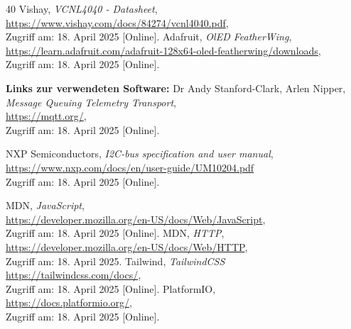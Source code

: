 \documentclass[12pt, letterpaper]{article}
\begin{document}
\begin{thebibliography}{40}
  Vishay, \textit{VCNL4040 - Datasheet}, \\ \url{https://www.vishay.com/docs/84274/vcnl4040.pdf}, \\ Zugriff am: 18. April 2025 [Online].
  Adafruit, \textit{OlED FeatherWing}, \\ \url{https://learn.adafruit.com/adafruit-128x64-oled-featherwing/downloads}, \\ Zugriff am: 18. April 2025 [Online].
  \par \textbf{Links zur verwendeten Software:}
  Dr Andy Stanford-Clark, Arlen Nipper, \textit{Message Queuing Telemetry Transport}, \\ \url{https://mqtt.org/}, \\ Zugriff am: 18. April 2025 [Online].

  NXP Semiconductors, \textit{I2C-bus specification and user manual}, \\  \url{https://www.nxp.com/docs/en/user-guide/UM10204.pdf} \\ Zugriff am: 18. April 2025 [Online].

  MDN, \textit{JavaScript}, \\ \url{https://developer.mozilla.org/en-US/docs/Web/JavaScript}, \\ Zugriff am: 18. April 2025 [Online].
  MDN, \textit{HTTP}, \\ \url{https://developer.mozilla.org/en-US/docs/Web/HTTP}, \\ Zugriff am: 18. April 2025.
  Tailwind, \textit{TailwindCSS} \\ \url{https://tailwindcss.com/docs/}, \\ Zugriff am: 18. April 2025 [Online].
  PlatformIO, \\ \url{https://docs.platformio.org/}, \\ Zugriff am: 18. April 2025 [Online].


\end{thebibliography}
\end{document}
